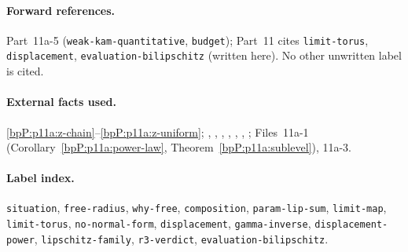 \paragraph{Forward references.} Part~11a-5 (\texttt{weak-kam-quantitative}, \texttt{budget}); Part~11 cites \texttt{limit-torus}, \texttt{displacement}, \texttt{evaluation-bilipschitz} (written here). No other unwritten label is cited.

\paragraph{External facts used.} \ref{bpP:p11a:z-chain}--\ref{bpP:p11a:z-uniform}; , , , , , , ; Files~11a-1 (Corollary~\ref{bpP:p11a:power-law}, Theorem~\ref{bpP:p11a:sublevel}), 11a-3.

\paragraph{Label index.} \texttt{situation}, \texttt{free-radius}, \texttt{why-free}, \texttt{composition}, \texttt{param-lip-sum}, \texttt{limit-map}, \texttt{limit-torus}, \texttt{no-normal-form}, \texttt{displacement}, \texttt{gamma-inverse}, \texttt{displacement-power}, \texttt{lipschitz-family}, \texttt{r3-verdict}, \texttt{evaluation-bilipschitz}.
\par\endgroup
